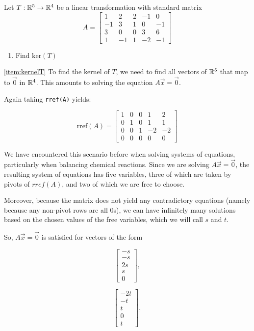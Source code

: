 \documentclass{ximera}
\begin{document}
\begin{example}\label{ex:kernel} Let $T:\mathbb{R}^5\rightarrow \mathbb{R}^4$ be a linear transformation with standard matrix $$A=\begin{bmatrix}1 & 2 & 2 &-1 & 0\\-1 & 3 & 1 & 0 & -1\\3 & 0 & 0 & 3 & 6\\ 1 & -1 & 1 & -2 & -1\end{bmatrix}$$
\begin{enumerate}
\item \label{item:kernelT}
Find $\mbox{ker}(T)$
\end{enumerate}
\begin{explanation}
\ref{item:kernelT} To find the kernel of $T$, we need to find all vectors of $\mathbb{R}^5$ that map to $\vec{0}$ in $\mathbb{R}^4$.  This amounts to solving the equation $A\vec{x}=\vec{0}$.
 
Again taking \texttt{rref(A)} yields:
 
$$\mbox{rref}(A)= \begin{bmatrix} 1 & 0 & 0 & 1 & 2\\0 & 1 & 0 & 1 & 1\\0 & 0 & 1 & -2 & -2\\ 0 & 0 & 0 & 0 & 0 \end{bmatrix}$$
 
We have encountered this scenario before when solving systems of equations, particularly when balancing chemical reactions. Since we are solving $A\vec{x}=\vec{0}$, the resulting system of equations has five variables, three of which are taken by pivots of $rref(A)$, and two of which we are free to choose. 

Moreover, because the matrix does not yield any contradictory equations (namely because any non-pivot rows are all $0$s), we can have infinitely many solutions based on the chosen values of the free variables, which we will call $s$ and $t$.

So, $A\vec{x}=\vec{0}$ is satisfied for vectors of the form 

$$\begin{bmatrix}-s\\-s\\2s\\s\\0\end{bmatrix},$$

$$\begin{bmatrix}-2t\\-t\\t\\0\\t\end{bmatrix},$$


\end{explanation}
\end{example}
\end{document}
